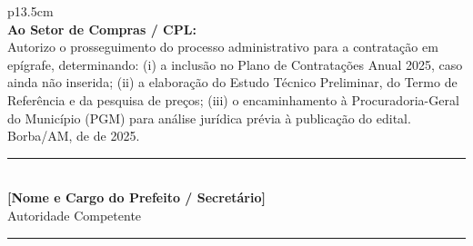 \documentclass[12pt,a4paper]{article}
\newcommand{\exercicio}{2025}
\begin{document}
\vspace{1.5cm}
\begin{table}[H]
\centering\small
\begin{tabular}{p{13.5cm}}
   \\
  \midrule
  \vspace{0.1cm}
  \textbf{Ao Setor de Compras / CPL:} \\[4pt]
  Autorizo o prosseguimento do processo administrativo para a contratação em epígrafe,
  determinando: (i) a inclusão no Plano de Contratações Anual \exercicio, caso ainda
  não inserida; (ii) a elaboração do Estudo Técnico Preliminar, do Termo de Referência
  e da pesquisa de preços; (iii) o encaminhamento à Procuradoria-Geral do Município
  (PGM) para análise jurídica prévia à publicação do edital. \\[4pt]
  Borba/AM, \underline{\hspace{1.5cm}} de \underline{\hspace{2.5cm}} de \exercicio. \\[0.8cm]
  \hfill\rule{7cm}{0.5pt}\hspace{1cm} \\
  \hfill\textbf{[Nome e Cargo do Prefeito / Secretário]} \\
  \hfill\small Autoridade Competente \\
  \vspace{0.1cm}
\end{tabular}
\end{table}

\vspace{1.2cm}
\noindent\textcolor{navy!30}{\rule{\linewidth}{0.5pt}}

\end{document}
